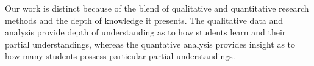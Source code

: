 Our work is distinct because of the blend of qualitative and quantitative
research methods and the depth of knowledge it presents. The qualitative data
and analysis provide depth of understanding as to how students learn and their
partial understandings, whereas the quantative analysis provides insight as to
how many students possess particular partial understandings.
